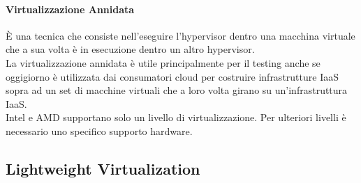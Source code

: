 \documentclass{article}
\begin{document}
\paragraph{Virtualizzazione Annidata}
È una tecnica che consiste nell’eseguire l’hypervisor dentro una macchina virtuale che a sua volta è in esecuzione dentro un altro hypervisor.\\
La virtualizzazione annidata è utile principalmente per il testing anche se oggigiorno è utilizzata dai consumatori cloud per costruire infrastrutture IaaS sopra ad un set di macchine virtuali che a loro volta girano su un’infrastruttura IaaS.\\
Intel e AMD supportano solo un livello di virtualizzazione. Per ulteriori livelli è necessario uno specifico supporto hardware.

\newpage
\subsection{Lightweight Virtualization}
\end{document}

